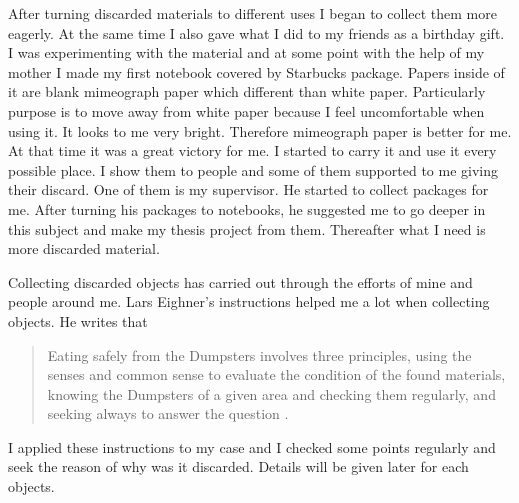 After turning discarded materials to different uses I began to collect them more eagerly. At the same time I also gave what I did to my friends as a birthday gift. I was experimenting with the material and at some point with the help of my mother I made my first notebook covered by Starbucks package. Papers inside of it are blank mimeograph paper which different than white paper. Particularly purpose is to move away from white paper because I feel uncomfortable when using it. It looks to me very bright. Therefore mimeograph paper is better for me. At that time it was a great victory for me. I started to carry it and use it every possible place. I show them to people and some of them supported to me giving their discard. One of them is my supervisor. He started to collect packages for me. After turning his packages to notebooks, he suggested me to go deeper in this subject and make my thesis project from them. Thereafter what I need is more discarded material.


Collecting discarded objects has carried out through the efforts of mine and people around me. Lars Eighner's instructions helped me a lot when collecting objects. He writes that 
\begin{quote}
Eating safely from the Dumpsters involves three principles, using the senses and common sense to evaluate the condition of the found materials, knowing the Dumpsters of a given area and checking them regularly, and seeking always to answer the question  \citep[as cited in][6]{strasser1999waste}.
\end{quote}
I applied these instructions to my case and I checked some points regularly and seek the reason of why was it discarded. Details will be given later for each objects. 





